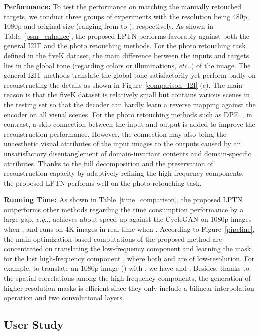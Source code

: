 \documentclass[10pt,twocolumn,letterpaper]{article}
\makeatletter
\DeclareRobustCommand\onedot{\futurelet\@let@token\@onedot}
\def\@onedot{\ifx\@let@token.\else.\null\fi\xspace}
\def\eg{\emph{e.g}\onedot} \def\Eg{\emph{E.g}\onedot}
\def\etc{\emph{etc}\onedot} \def\vs{\emph{vs}\onedot}
\makeatother
\begin{document}
	
	\noindent\textbf{Performance: }
	To test the performance on matching the manually retouched targets, we conduct three groups of experiments with the resolution being 480p, 1080p and original size (ranging from  to ), respectively. As shown in Table~\ref{psnr_enhance}, the proposed LPTN performs favorably against both the general I2IT and the photo retouching methods. For the photo retouching task defined in the fiveK dataset, the main difference between the inputs and targets lies in the global tone (regarding colors or illuminations, \etc) of the image. The general I2IT methods translate the global tone satisfactorily yet perform badly on reconstructing the details as shown in Figure~\ref{comparison_I2I} (c). The main reason is that the fiveK dataset is relatively small but contains various scenes in the testing set so that the decoder can hardly learn a reverse mapping against the encoder on all visual scenes. For the photo retouching methods such as DPE~\cite{chen2018deep}, in contrast, a skip connection between the input and output is added to improve the reconstruction performance. However, the connection may also bring the unaesthetic visual attributes of the input images to the outputs caused by an unsatisfactory disentanglement of domain-invariant contents and domain-specific attributes. Thanks to the full decomposition and the preservation of reconstruction capacity by adaptively refining the high-frequency components, the proposed LPTN performs well on the photo retouching task.
	
	\noindent\textbf{Running Time: } As shown in Table~\ref{time_comparison}, the proposed LPTN outperforms other methods regarding the time consumption performance by a large gap, \eg, achieves about  speed-up against the CycleGAN on 1080p images when , and runs on 4K images in real-time when . According to Figure~\ref{pipeline}, the main optimization-based computations of the proposed method are concentrated on translating the low-frequency component  and learning the mask for the last high-frequency component , where both  and  are of low-resolution. For example, to translate an 1080p image () with , we have  and . Besides, thanks to the spatial correlations among the high-frequency components, the generation of higher-resolution masks is efficient since they only include a bilinear interpolation operation and two convolutional layers.

	\subsection{User Study}
	
\end{document}
